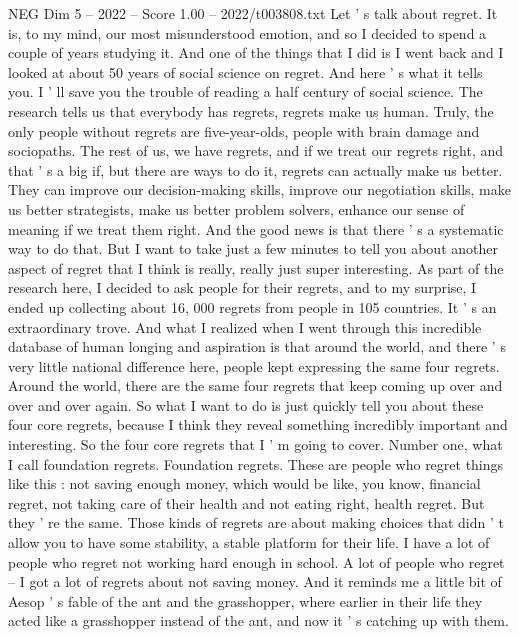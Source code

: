 \begin{textsample}{NEG Dim 5 – 2022 – Score 1.00 – 2022/t003808.txt}  \label{ex:f5_neg_036}
Let ' s talk about regret.
It is, to my mind, our most misunderstood emotion, and so I decided to spend a couple of years studying it.
And one of the things that I did is I went back and I looked at about 50 years of social science on regret.
And here ' s what it tells you.
I ' ll save you the trouble of reading a half century of social science.
The research tells us that everybody has regrets, regrets make us human.
Truly, the only people without regrets are five-year-olds, people with brain damage and sociopaths.
The rest of us, we have regrets, and if we treat our regrets right, and that ' s a big if, but there are ways to do it, regrets can actually make us better.
They can improve our decision-making skills, improve our negotiation skills, make us better strategists, make us better problem solvers, enhance our sense of meaning if we treat them right.
And the good news is that there ' s a systematic way to do that.
But I want to take just a few minutes to tell you about another aspect of regret that I think is really, really just super interesting.
As part of the research here, I decided to ask people for their regrets, and to my surprise, I ended up collecting about 16, 000 regrets from people in 105 countries.
It ' s an extraordinary trove.
And what I realized when I went through this incredible database of human longing and aspiration is that around the world, and there ' s very little national difference here, people kept expressing the same four regrets.
Around the world, there are the same four regrets that keep coming up over and over and over again.
So what I want to do is just quickly tell you about these four core regrets, because I think they reveal something incredibly important and interesting.
So the four core regrets that I ' m going to cover.
Number one, what I call foundation regrets.
Foundation regrets.
These are people who regret things like this : not saving enough money, which would be like, you know, financial regret, not taking care of their health and not eating right, health regret.
But they ' re the same.
Those kinds of regrets are about making choices that didn ' t allow you to have some stability, a stable platform for their life.
I have a lot of people who regret not working hard enough in school.
A lot of people who regret -- I got a lot of regrets about not saving money.
And it reminds me a little bit of Aesop ' s fable of the ant and the grasshopper, where earlier in their life they acted like a grasshopper instead of the ant, and now it ' s catching up with them.

\end{textsample}
